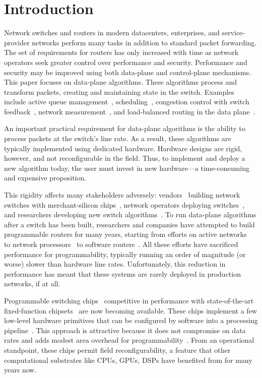 \section{Introduction}
\label{s:intro}

Network switches and routers in modern datacenters, enterprises, and
service-provider networks perform many tasks in addition to standard
packet forwarding. The set of requirements for routers has only
increased with time as network operators seek greater control over
performance and security.  Performance and security may be improved
using both data-plane and control-plane mechanisms. This paper focuses
on data-plane algorithms. These algorithms process and transform
packets, creating and maintaining state in the switch. Examples
include active queue management~\cite{red,blue,avq,codel,pie},
scheduling~\cite{pifo-hotnets}, congestion control with switch
feedback~\cite{xcp, rcp, pdq, dctcp}, network
measurement~\cite{opensketch, bitmap_george, elephant_george}, and
load-balanced routing in the data plane~\cite{conga}.

An important practical requirement for data-plane algorithms is the
ability to process packets at the switch's line rate.  As a result,
these algorithms are typically implemented using dedicated
hardware. Hardware designs are rigid, however, and not reconfigurable
in the field. Thus, to implement and deploy a new algorithm today, the
user must invest in new hardware---a time-consuming and expensive
proposition.

This rigidity affects many stakeholders adversely:
vendors~\cite{cisco_nexus, dell_force10, arista_7050} building network
switches with merchant-silicon chips~\cite{trident, tomahawk,
  mellanox}, network operators deploying
switches~\cite{google,facebook,vl2}, and researchers developing new
switch algorithms~\cite{xcp, codel, d3, detail, pdq}.  To run
data-plane algorithms after a switch has been built, researchers and
companies have attempted to build programmable routers for many years,
starting from efforts on active networks~\cite{active-nets} to network
processors~\cite{npu_survey} to software
routers~\cite{click,routebricks}. All these efforts have sacrificed
performance for programmability, typically running an order of
magnitude (or worse) slower than hardware line rates. Unfortunately,
this reduction in performance has meant that these systems are rarely
deployed in production networks, if at all.

Programmable switching chips~\cite{flexpipe, xpliant, rmt, corsa,
  uadp, algo_logic} competitive in performance with state-of-the-art
fixed-function chipsets~\cite{trident, tomahawk, mellanox} are now
becoming available. These chips implement a few low-level hardware
primitives that can be configured by software into a processing
pipeline~\cite{xpliant_sdk,xpliant_sdk2,intel_sdk}.  This approach is
attractive because it does not compromise on data rates and adds
modest area overhead for programmability~\cite{rmt}. From an
operational standpoint, these chips permit field reconfigurability, a
feature that other computational substrates like CPUs, GPUs,
DSPs have benefited from for many years now.

